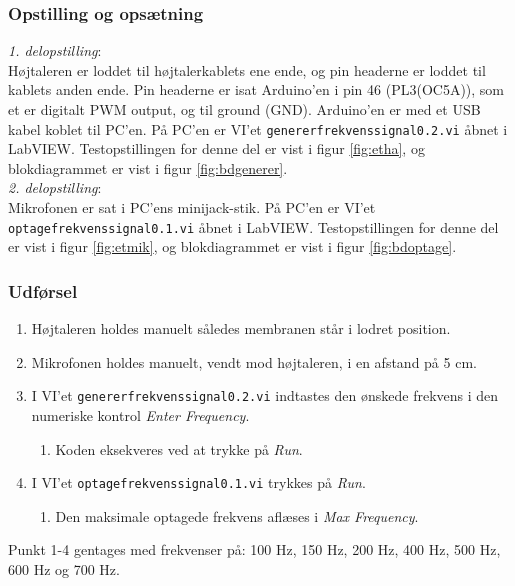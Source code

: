 {		\subsubsection{Opstilling og opsætning}
		\textit{1. delopstilling}:\\
		Højtaleren er loddet til højtalerkablets ene ende, og pin headerne er loddet til kablets anden ende. 
		Pin headerne er isat Arduino'en i pin 46 (PL3(OC5A)), som et er digitalt PWM output, og til ground (GND). 
		Arduino'en er med et USB kabel koblet til PC'en. 		
		På PC'en er VI'et \texttt{genererfrekvenssignal0.2.vi} åbnet i LabVIEW. Testopstillingen for denne del er vist i figur \ref{fig:etha}, og blokdiagrammet er vist i figur \ref{fig:bdgenerer}.\\ 
 
		\textit{2. delopstilling}:\\
		Mikrofonen er sat i PC'ens minijack-stik. På PC'en er VI'et \texttt{optagefrekvenssignal0.1.vi} åbnet i LabVIEW. Testopstillingen for denne del er vist i figur \ref{fig:etmik}, og blokdiagrammet er vist i figur \ref{fig:bdoptage}.\\ 
		
		\subsubsection{Udførsel}
			\begin{enumerate}
				\item Højtaleren holdes manuelt således membranen står i lodret position. 
				\item Mikrofonen holdes manuelt, vendt mod højtaleren, i en afstand på 5 cm. 
				\item I VI'et \texttt{genererfrekvenssignal0.2.vi} indtastes den ønskede frekvens i den numeriske kontrol \textit{Enter Frequency}. 
					\begin{enumerate}
						\item Koden eksekveres ved at trykke på \textit{Run}. 
					\end{enumerate} 
				\item I VI'et \texttt{optagefrekvenssignal0.1.vi} trykkes på \textit{Run}. 
					\begin{enumerate}
						\item Den maksimale optagede frekvens aflæses i \textit{Max Frequency}. 
					\end{enumerate}	  
			\end{enumerate}
			
			Punkt 1-4 gentages med frekvenser på: 100 Hz, 150 Hz, 200 Hz, 400 Hz, 500 Hz, 600 Hz og 700 Hz. 
			
}
